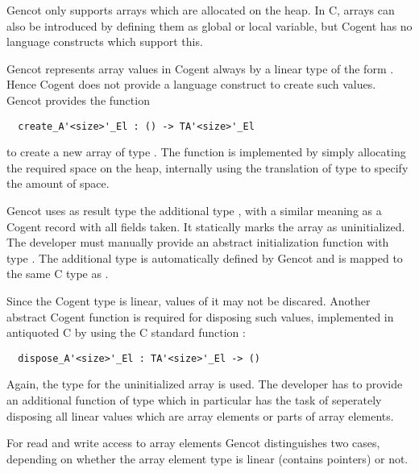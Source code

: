 Gencot only supports arrays which are allocated on the heap. In C, arrays can also be introduced by defining
them as global or local variable, but Cogent has no language constructs which support this.

Gencot represents array values in Cogent always by a linear type of the form .
Hence Cogent does not provide a language construct to create such values. Gencot provides the function
\begin{verbatim}
  create_A'<size>'_El : () -> TA'<size>'_El
\end{verbatim}
to create a new array of type . The function is implemented by simply allocating the
required space on the heap, internally using the translation of type  to specify
the amount of space. 

Gencot uses as result type the additional type , with a similar meaning as a Cogent
record with all fields taken. It statically marks the array as uninitialized. The developer must manually provide
an abstract initialization function with type . The additional type
is automatically defined by Gencot and is mapped to the same C type as .

Since the Cogent type  is linear, values of it may not be discared. Another abstract 
Cogent function is required for
disposing such values, implemented in antiquoted C by using the C standard function :
\begin{verbatim}
  dispose_A'<size>'_El : TA'<size>'_El -> ()
\end{verbatim}
Again, the type for the uninitialized array is used. The developer has to provide an additional function
of type  which in particular has the task of seperately disposing 
all linear values which are array elements or parts of array elements.

For read and write access to array elements Gencot distinguishes two cases, depending on whether the array element
type is linear (contains pointers) or not.

